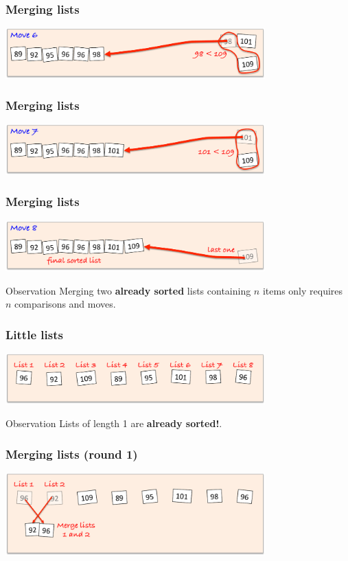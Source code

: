 \documentclass{beamer} %
\newcommand\emc[1]{\textcolor{midred}{\textbf{#1}}}
\begin{document}
\begin{frame}
  \frametitle{Merging lists}
  \centering
  \includegraphics[width=100mm]{assets/merge-move6-crop.pdf}
\end{frame}

\begin{frame}
  \frametitle{Merging lists}
  \centering
  \includegraphics[width=100mm]{assets/merge-move7-crop.pdf}
\end{frame}

\begin{frame}
  \frametitle{Merging lists}
  \centering
  \includegraphics[width=100mm]{assets/merge-move8-crop.pdf}

  \begin{block}{Observation}
    Merging two \emc{already sorted} lists containing $n$ items only requires $n$ comparisons and moves.
    \end{block}
\end{frame}

\begin{frame}
  \frametitle{Little lists}
  \centering
  \includegraphics[width=100mm]{assets/merge-move9-crop.pdf}
  \begin{block}{Observation}
    Lists of length 1 are \emc{already sorted!}.
    \end{block}
\end{frame}

\begin{frame}
  \frametitle{Merging lists (round 1)}
  \centering
  \includegraphics[width=100mm]{assets/merge-move10-crop.pdf}
\end{frame}
\end{document}
